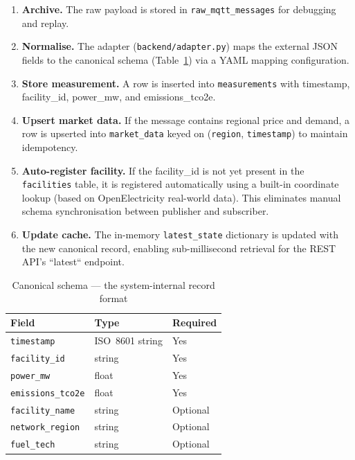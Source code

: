 \documentclass[11pt,a4paper]{article}
\begin{document}
\begin{enumerate}
    \item \textbf{Archive.} The raw payload is stored in \texttt{raw\_mqtt\_messages} for debugging and replay.
    \item \textbf{Normalise.} The adapter (\texttt{backend/adapter.py}) maps the external JSON fields to the canonical schema (Table~\ref{tab:canonical}) via a YAML mapping configuration.
    \item \textbf{Store measurement.} A row is inserted into \texttt{measurements} with timestamp, facility\_id, power\_mw, and emissions\_tco2e.
    \item \textbf{Upsert market data.} If the message contains regional price and demand, a row is upserted into \texttt{market\_data} keyed on (\texttt{region}, \texttt{timestamp}) to maintain idempotency.
    \item \textbf{Auto-register facility.} If the facility\_id is not yet present in the \texttt{facilities} table, it is registered automatically using a built-in coordinate lookup (based on OpenElectricity real-world data). This eliminates manual schema synchronisation between publisher and subscriber.
    \item \textbf{Update cache.} The in-memory \texttt{latest\_state} dictionary is updated with the new canonical record, enabling sub-millisecond retrieval for the REST API's ``latest`` endpoint.
\end{enumerate}

\begin{table}[H]
\centering
\caption{Canonical schema --- the system-internal record format}
\label{tab:canonical}
\begin{tabular}{lll}
\toprule
\textbf{Field} & \textbf{Type} & \textbf{Required} \\
\midrule
\texttt{timestamp} & ISO~8601 string & Yes \\
\texttt{facility\_id} & string & Yes \\
\texttt{power\_mw} & float & Yes \\
\texttt{emissions\_tco2e} & float & Yes \\
\texttt{facility\_name} & string & Optional \\
\texttt{network\_region} & string & Optional \\
\texttt{fuel\_tech} & string & Optional \\
\bottomrule
\end{tabular}
\end{table}
\end{document}
